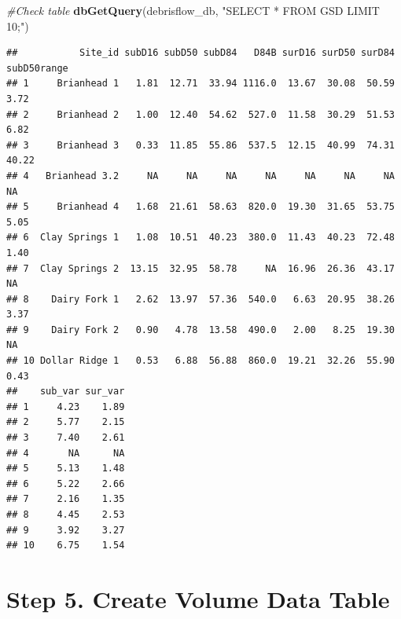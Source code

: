 \documentclass[
]{book}
\newenvironment{Shaded}{\begin{snugshade}}{\end{snugshade}}
\newcommand{\CommentTok}[1]{\textcolor[rgb]{0.56,0.35,0.01}{\textit{#1}}}
\newcommand{\KeywordTok}[1]{\textcolor[rgb]{0.13,0.29,0.53}{\textbf{#1}}}
\newcommand{\NormalTok}[1]{#1}
\newcommand{\StringTok}[1]{\textcolor[rgb]{0.31,0.60,0.02}{#1}}
\begin{document}
\begin{Shaded}
\begin{Highlighting}[]
\CommentTok{#Check table}
\KeywordTok{dbGetQuery}\NormalTok{(debrisflow_db, }\StringTok{"SELECT * FROM GSD LIMIT 10;"}\NormalTok{)}
\end{Highlighting}
\end{Shaded}

\begin{verbatim}
##           Site_id subD16 subD50 subD84   D84B surD16 surD50 surD84 subD50range
## 1     Brianhead 1   1.81  12.71  33.94 1116.0  13.67  30.08  50.59        3.72
## 2     Brianhead 2   1.00  12.40  54.62  527.0  11.58  30.29  51.53        6.82
## 3     Brianhead 3   0.33  11.85  55.86  537.5  12.15  40.99  74.31       40.22
## 4   Brianhead 3.2     NA     NA     NA     NA     NA     NA     NA          NA
## 5     Brianhead 4   1.68  21.61  58.63  820.0  19.30  31.65  53.75        5.05
## 6  Clay Springs 1   1.08  10.51  40.23  380.0  11.43  40.23  72.48        1.40
## 7  Clay Springs 2  13.15  32.95  58.78     NA  16.96  26.36  43.17          NA
## 8    Dairy Fork 1   2.62  13.97  57.36  540.0   6.63  20.95  38.26        3.37
## 9    Dairy Fork 2   0.90   4.78  13.58  490.0   2.00   8.25  19.30          NA
## 10 Dollar Ridge 1   0.53   6.88  56.88  860.0  19.21  32.26  55.90        0.43
##    sub_var sur_var
## 1     4.23    1.89
## 2     5.77    2.15
## 3     7.40    2.61
## 4       NA      NA
## 5     5.13    1.48
## 6     5.22    2.66
## 7     2.16    1.35
## 8     4.45    2.53
## 9     3.92    3.27
## 10    6.75    1.54
\end{verbatim}

\hypertarget{step-5.-create-volume-data-table}{%
\section{Step 5. Create Volume Data Table}\label{step-5.-create-volume-data-table}}
\end{document}

